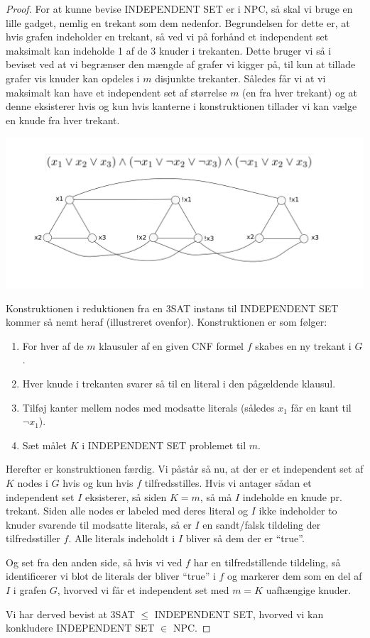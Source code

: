 \begin{proof}
 For at kunne bevise INDEPENDENT SET er i NPC, så skal vi bruge en lille
 gadget, nemlig en trekant som dem nedenfor. Begrundelsen for dette er, at hvis
 grafen indeholder en trekant, så ved vi på forhånd et independent set
 maksimalt kan indeholde 1 af de 3 knuder i trekanten. Dette bruger vi så i
 beviset ved at vi begrænser den mængde af grafer vi kigger på, til kun at
 tillade grafer vis knuder kan opdeles i $m$ disjunkte trekanter. Således får
 vi at vi maksimalt kan have et independent set af størrelse $m$ (en fra hver
 trekant) og at denne eksisterer hvis og kun hvis kanterne i konstruktionen
 tillader vi kan vælge en knude fra hver trekant.
 \begin{center}
 \includegraphics[bb=0 0 842 595,scale=0.5]{img/INDEPENDENTSET.png}
\end{center}
Konstruktionen i reduktionen fra en 3SAT instans til INDEPENDENT SET kommer så
nemt heraf (illustreret ovenfor). Konstruktionen er som følger:

\begin{enumerate}
 \item For hver af de $m$ klausuler af en given CNF formel $f$ skabes en ny
	 trekant i $G$.
 \item Hver knude i trekanten svarer så til en literal i den pågældende klausul.
 \item Tilføj kanter mellem nodes med modsatte literals (således $x_1$ får en
	 kant til $\neg x_1$).
 \item Sæt målet $K$ i INDEPENDENT SET problemet til $m$.
\end{enumerate}

Herefter er konstruktionen færdig. Vi påstår så nu, at der er et independent
set af $K$ nodes i $G$ hvis og kun hvis $f$ tilfredsstilles. Hvis vi antager
sådan et independent set $I$ eksisterer, så siden $K=m$, så må $I$ indeholde en
knude pr. trekant. Siden alle nodes er labeled med deres literal og $I$ ikke
indeholder to knuder svarende til modsatte literals, så er $I$ en sandt/falsk
tildeling der tilfredsstiller $f$. Alle literals indeholdt i $I$ bliver så dem
der er ``true''.

Og set fra den anden side, så hvis vi ved $f$ har en tilfredstillende
tildeling, så identificerer vi blot de literals der bliver ``true'' i $f$ og
markerer dem som en del af $I$ i grafen $G$, hvorved vi får et independent set
med $m=K$ uafhængige knuder.

Vi har derved bevist at 3SAT $\leq$ INDEPENDENT SET, hvorved vi kan konkludere
INDEPENDENT SET $\in$ NPC.
\end{proof}

